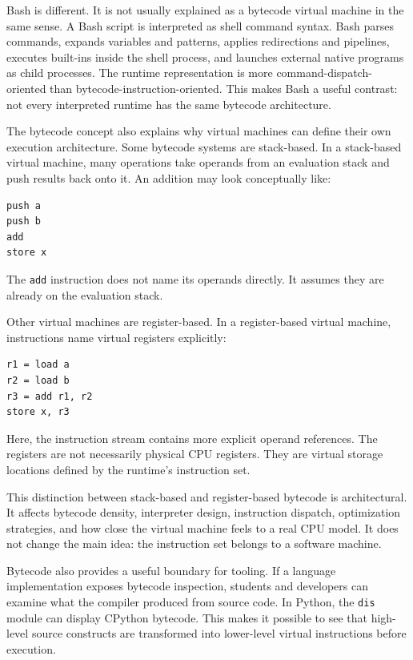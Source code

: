 Bash is different. It is not usually explained as a bytecode virtual machine in the same sense. A Bash script is interpreted as shell command syntax. Bash parses commands, expands variables and patterns, applies redirections and pipelines, executes built-ins inside the shell process, and launches external native programs as child processes. The runtime representation is more command-dispatch-oriented than bytecode-instruction-oriented. This makes Bash a useful contrast: not every interpreted runtime has the same bytecode architecture.

The bytecode concept also explains why virtual machines can define their own execution architecture. Some bytecode systems are stack-based. In a stack-based virtual machine, many operations take operands from an evaluation stack and push results back onto it. An addition may look conceptually like:

\begin{verbatim}
push a
push b
add
store x
\end{verbatim}

The \texttt{add} instruction does not name its operands directly. It assumes they are already on the evaluation stack.

Other virtual machines are register-based. In a register-based virtual machine, instructions name virtual registers explicitly:

\begin{verbatim}
r1 = load a
r2 = load b
r3 = add r1, r2
store x, r3
\end{verbatim}

Here, the instruction stream contains more explicit operand references. The registers are not necessarily physical CPU registers. They are virtual storage locations defined by the runtime's instruction set.

This distinction between stack-based and register-based bytecode is architectural. It affects bytecode density, interpreter design, instruction dispatch, optimization strategies, and how close the virtual machine feels to a real CPU model. It does not change the main idea: the instruction set belongs to a software machine.

Bytecode also provides a useful boundary for tooling. If a language implementation exposes bytecode inspection, students and developers can examine what the compiler produced from source code. In Python, the \texttt{dis} module can display CPython bytecode. This makes it possible to see that high-level source constructs are transformed into lower-level virtual instructions before execution.

